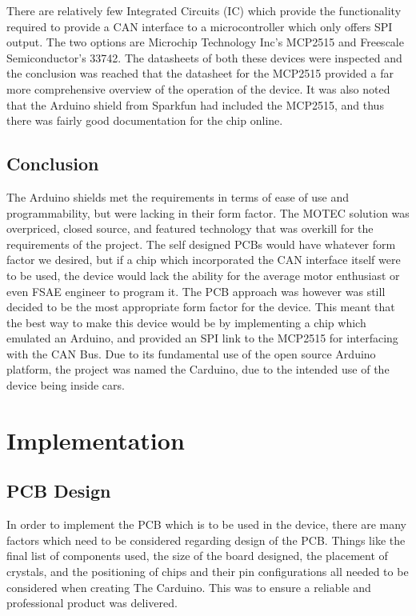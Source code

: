 There are relatively few Integrated Circuits (IC) which provide the functionality required to provide a CAN interface to a microcontroller which only offers SPI output. The two options are Microchip Technology Inc's MCP2515\cite{MCP2515_datasheet} and Freescale Semiconductor's 33742\cite{33742_datasheet}. The datasheets of both these devices were inspected and the conclusion was reached that the datasheet for the MCP2515 provided a far more comprehensive overview of the operation of the device. It was also noted that the Arduino shield from Sparkfun\cite{CAN_arduinoshield} had included the MCP2515, and thus there was fairly good documentation for the chip online.

\subsection{Conclusion}
The Arduino shields met the requirements in terms of ease of use and programmability, but were lacking in their form factor. The MOTEC solution was overpriced, closed source, and featured technology that was overkill for the requirements of the project. The self designed PCBs would have whatever form factor we desired, but if a chip which incorporated the CAN interface itself were to be used, the device would lack the ability for the average motor enthusiast or even FSAE engineer to program it. The PCB approach was however was still decided to be the most appropriate form factor for the device. This meant that the best way to make this device would be by implementing a chip which emulated an Arduino, and provided an SPI link to the MCP2515 for interfacing with the CAN Bus. Due to its fundamental use of the open source Arduino platform, the project was named the Carduino, due to the intended use of the device being inside cars.

\section{Implementation}
\subsection{PCB Design}
In order to implement the PCB which is to be used in the device, there are many factors which need to be considered regarding design of the PCB. Things like the final list of components used, the size of the board designed, the placement of crystals, and the positioning of chips and their pin configurations all needed to be considered when creating The Carduino. This was to ensure a reliable and professional product was delivered.

